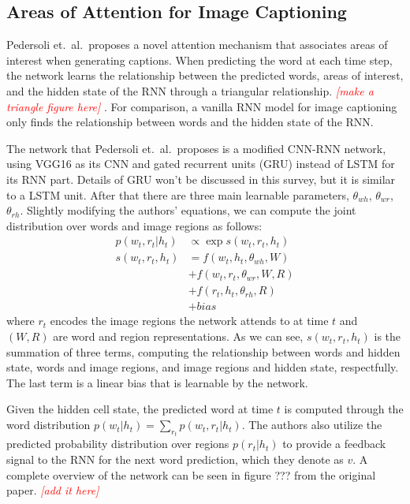 \documentclass[10pt,twocolumn,letterpaper]{article}
\newcommand{\todo}[1]{\textcolor{red}{{\em [#1]}} }
\begin{document}
\subsection{Areas of Attention for Image Captioning}

Pedersoli et.\ al.\ proposes a novel attention mechanism that associates
areas of interest when generating captions. When predicting the word at each
time step, the network learns the relationship between the predicted words,
areas of interest, and the hidden state of the RNN through a triangular
relationship. \todo{make a triangle figure here}. For comparison, a vanilla
RNN model for image captioning only finds the relationship between words and
the hidden state of the RNN.

The network that Pedersoli et.\ al.\ proposes is a modified CNN-RNN network,
using VGG16 as its CNN and gated recurrent units (GRU) instead of LSTM for its
RNN part. Details of GRU won't be discussed in this survey, but it is similar
to a LSTM unit. After that there are three main learnable parameters,
$\theta_{wh}$, $\theta_{wr}$, $\theta_{rh}$. Slightly modifying the authors'
equations, we can compute the joint distribution over words and image regions
as follows:
%
\begin{equation}
  \begin{aligned}
    p(w_t, r_t|h_t) &\propto \exp s(w_t, r_t, h_t) \\
    s(w_t, r_t, h_t) &= f(w_t, h_t, \theta_{wh}, W) \\
                     &+ f(w_t, r_t, \theta_{wr}, W, R) \\
                     &+ f(r_t, h_t, \theta_{rh}, R) \\
                     &+ bias
  \end{aligned}
\end{equation}
%
where $r_t$ encodes the image regions the network attends to at time $t$ and
$(W,R)$ are word and region representations. As we can see, $s(w_t, r_t, h_t)$
is the summation of three terms, computing the relationship between words and
hidden state, words and image regions, and image regions and hidden state,
respectfully. The last term is a linear bias that is learnable by the network.

Given the hidden cell state, the predicted word at time $t$ is computed
through the word distribution $p(w_t|h_t) = \sum_{r_t} p(w_t,r_t|h_t)$. The
authors also utilize the predicted probability distribution over regions
$p(r_t|h_t)$ to provide a feedback signal to the RNN for the next word
prediction, which they denote as $v$. A complete overview of the network can
be seen in figure ??? from the original paper. \todo{add it here}
\end{document}
